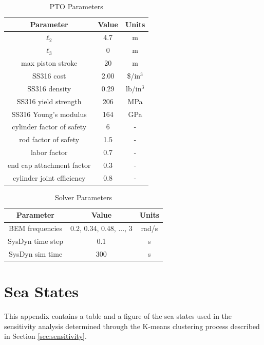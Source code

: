 \documentclass[a4paper,12pt]{elsarticle}
\begin{document}
\begin{table}[h]
    \centering
    \caption{PTO Parameters}
    \begin{tabular}{ccc}
        \hline
        \textbf{Parameter} & \textbf{Value} & \textbf{Units} \\
        \hline
        $\ell_2$ & 4.7 & m \\
        $\ell_3$ & 0 & m \\
        max piston stroke & 20 & m \\
        SS316 cost & 2.00 \cite{316ss} & \$/in$^3$ \\
        SS316 density & 0.29 \cite{316ss} & lb/in$^3$ \\
        SS316 yield strength & 206 \cite{316ss} & MPa \\
        SS316 Young's modulus & 164 \cite{316ss} & GPa \\
        cylinder factor of safety & 6 & - \\
        rod factor of safety & 1.5 & - \\
        labor factor & 0.7 & - \\
        end cap attachment factor & 0.3 \cite{ASME_BPVC} & - \\
        cylinder joint efficiency & 0.8 \cite{ASME_BPVC} & - \\
        \hline
    \end{tabular}
    \label{tab:paramspto}
\end{table}

\begin{table}[h]
    \centering
    \caption{Solver Parameters}
    \begin{tabular}{ccc}
        \hline
        \textbf{Parameter} & \textbf{Value} & \textbf{Units} \\
        \hline
        BEM frequencies & 0.2, 0.34, 0.48, ..., 3& rad/s \\
        SysDyn time step & 0.1 & s \\
        SysDyn sim time & 300 & s \\
        \hline
    \end{tabular}
    \label{tab:paramssolve}
\end{table}

\section{Sea States} \label{app:seastates}

This appendix contains a table and a figure of the sea states used in the sensitivity analysis determined through the K-means clustering process described in Section \ref{sec:sensitivity}. 
\end{document}
